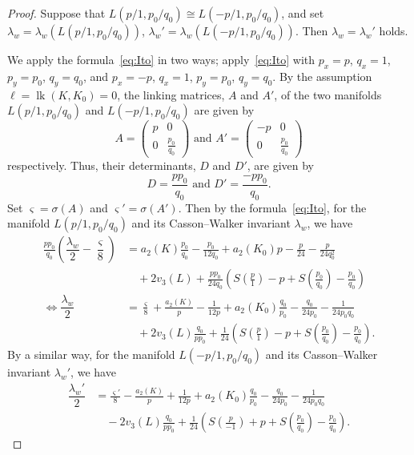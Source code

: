 \documentclass{amsart}
\theoremstyle{remark}
\newcommand{\lk}{\mathop{\mathrm{lk}}\nolimits}
\begin{document}
\begin{proof}
Suppose that $L(p/1,p_0/q_0) \cong L(-p/1, p_0/q_0)$, and set $\lambda_w = \lambda_w ( L(p/1,p_0/q_0))$, $\lambda_w' = \lambda_w ( L(- p/1, p_0/q_0))$. 
Then $\lambda_w = \lambda_w'$ holds. 

We apply the formula~\eqref{eq:Ito} in two ways; apply~\eqref{eq:Ito} with $p_x = p$, $q_x=1$, $p_y=p_0$, $q_y=q_0$, and $p_x = -p$, $q_x = 1$, $p_y=p_0$, $q_y=q_0$. 
By the assumption $\ell = \lk (K,K_0) = 0$, the linking matrices, $A$ and $A'$, of the two manifolds $L(p/1,p_0/q_0)$ and $L(-p/1, p_0/q_0)$ are given by
\[ A = \begin{pmatrix} p & 0 \\ 0 & \frac{p_0}{q_0} \end{pmatrix} \text{ and } A'=\begin{pmatrix} -p & 0 \\ 0 & \frac{p_0}{q_0} \end{pmatrix}\] 
respectively. 
Thus, their determinants, $D$ and $D'$, are given by 
\[ D = \frac{p p_0}{q_0} \text{ and } D' = \frac{-p p_0}{q_0} . \]
Set $\varsigma = \sigma(A)$ and $\varsigma'= \sigma(A')$. 
Then by the formula~\eqref{eq:Ito}, for the manifold $L(p/1,p_0/q_0)$ and its Casson--Walker invariant $\lambda_w$, we have 
\begin{align*}
    \frac{p p_0}{q_0}\left( \dfrac{\lambda_w}{2} - \dfrac{\varsigma}{8}\right)
    &= a_2(K)\frac{p_0}{q_0} - \frac{p_0}{12q_0} + a_2(K_0)p - \frac{p}{24} - \frac{p}{24q_0^2} \\ 
    &\quad + 2v_3(L) + \frac{pp_0}{24q_0}\left( S\left(\frac{p}{1}\right) - p + S\left(\frac{p_0}{q_0}\right) - \frac{p_0}{q_0}\right)\\ 
    \iff
    \dfrac{\lambda_w}{2} 
    &= \frac{\varsigma}{8} + \frac{a_2(K)}{p} - \frac{1}{12p} + a_2(K_0)\frac{q_0}{p_0} - \frac{q_0}{24p_0} - \frac{1}{24p_0q_0} \\ 
    &\quad + 2v_3(L)\frac{q_0}{p p_0} + \frac{1}{24}\left( S\left(\frac{p}{1}\right) - p + S\left(\frac{p_0}{q_0}\right) - \frac{p_0}{q_0}\right). 
\end{align*}
By a similar way, for the manifold $L(-p/1,p_0/q_0)$ and its Casson--Walker invariant $\lambda_w'$, we have 
\begin{align*}
    \dfrac{\lambda_w'}{2} 
    &= \frac{\varsigma'}{8} - \frac{a_2(K)}{p} + \frac{1}{12p} + a_2(K_0)\frac{q_0}{p_0} - \frac{q_0}{24p_0} - \frac{1}{24p_0q_0} \\ 
    &\quad - 2v_3(L)\frac{q_0}{p p_0} + \frac{1}{24}\left( S\left(\frac{p}{-1}\right) + p + S\left(\frac{p_0}{q_0}\right) - \frac{p_0}{q_0}\right). 

\end{align*}
\end{proof}
\end{document}
